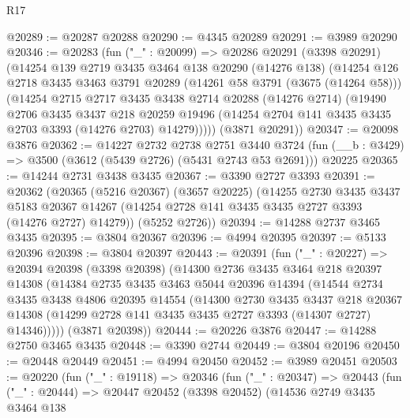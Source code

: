 \begin{lexlean}{R17}
\begin{coremodule}
@20289 := @20287 @20288
@20290 := @4345 @20289
@20291 := @3989 @20290
@20346 := @20283
    (fun ("_" : @20099) =>
    @20286
      @20291
      (@3398 @20291)
      (@14254
        @139
        @2719
        @3435
        @3464
        @138
        @20290
        (@14276 @138)
        (@14254
          @126
          @2718
          @3435
          @3463
          @3791
          @20289
          (@14261 @58 @3791 (@3675 (@14264 @58)))
          (@14254
            @2715
            @2717
            @3435
            @3438
            @2714
            @20288
            (@14276 @2714)
            (@19490
              @2706
              @3435
              @3437
              @218
              @20259
              @19496
              (@14254 @2704 @141 @3435 @3435 @2703 @3393 (@14276 @2703) @14279)))))
      (@3871 @20291))
@20347 := @20098 @3876
@20362 := @14227
    @2732
    @2738
    @2751
    @3440
    @3724
    (fun (__b : @3429) => @3500 (@3612 (@5439 @2726) (@5431 @2743 @53 @2691)))
    @20225
@20365 := @14244 @2731 @3438 @3435
@20367 := @3390 @2727 @3393
@20391 := @20362
    (@20365
      (@5216 @20367)
      (@3657 @20225)
      (@14255
        @2730
        @3435
        @3437
        @5183
        @20367
        @14267
        (@14254 @2728 @141 @3435 @3435 @2727 @3393 (@14276 @2727) @14279))
      (@5252 @2726))
@20394 := @14288 @2737 @3465 @3435
@20395 := @3804 @20367
@20396 := @4994 @20395
@20397 := @5133 @20396
@20398 := @3804 @20397
@20443 := @20391
    (fun ("_" : @20227) =>
    @20394
      @20398
      (@3398 @20398)
      (@14300
        @2736
        @3435
        @3464
        @218
        @20397
        @14308
        (@14384
          @2735
          @3435
          @3463
          @5044
          @20396
          @14394
          (@14544
            @2734
            @3435
            @3438
            @4806
            @20395
            @14554
            (@14300
              @2730
              @3435
              @3437
              @218
              @20367
              @14308
              (@14299 @2728 @141 @3435 @3435 @2727 @3393 (@14307 @2727) @14346)))))
      (@3871 @20398))
@20444 := @20226 @3876
@20447 := @14288 @2750 @3465 @3435
@20448 := @3390 @2744
@20449 := @3804 @20196
@20450 := @20448 @20449
@20451 := @4994 @20450
@20452 := @3989 @20451
@20503 := @20220
    (fun ("_" : @19118) =>
    @20346
      (fun ("_" : @20347) =>
      @20443
        (fun ("_" : @20444) =>
        @20447
          @20452
          (@3398 @20452)
          (@14536
            @2749
            @3435
            @3464
            @138

\end{coremodule}
\end{lexlean}

